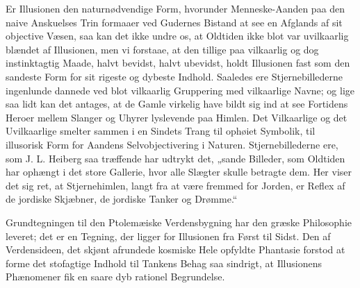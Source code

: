 \documentclass[12pt,a4paper]{book}
\begin{document}
Er Illusionen den naturnødvendige Form, hvorunder Menneske-Aanden paa
den naive Anskuelses Trin formaaer ved Gudernes Bistand at see en
Afglands af sit objective Væsen, saa kan det ikke undre os, at Oldtiden
ikke blot var uvilkaarlig blændet af Illusionen, men vi forstaae, at
den tillige paa vilkaarlig og dog instinktagtig Maade, halvt bevidst,
halvt ubevidst, holdt Illusionen fast som den sandeste Form for sit
rigeste og dybeste Indhold. Saaledes ere Stjernebillederne ingenlunde
dannede ved blot vilkaarlig Gruppering med vilkaarlige Navne; og lige
saa lidt kan det antages, at de Gamle virkelig have bildt sig ind at
see Fortidens Heroer mellem Slanger og Uhyrer lyslevende paa Himlen.
Det Vilkaarlige og det Uvilkaarlige smelter sammen i en Sindets Trang
til ophøiet Symbolik, til illusorisk Form for Aandens
Selvobjectivering i Naturen. Stjernebillederne ere, som J. L. Heiberg
saa træffende har udtrykt det, „sande Billeder, som Oldtiden har
ophængt i det store Gallerie, hvor alle Slægter skulle betragte dem.
Her viser det sig ret, at Stjernehimlen, langt fra at være fremmed for
Jorden, er Reflex af de jordiske Skjæbner, de jordiske Tanker og
Drømme.“

Grundtegningen til den Ptolemæiske Verdensbygning har den græske
Philosophie leveret; det er en Tegning, der ligger for Illusionen fra
Først til Sidst. Den af Verdensideen, det skjønt afrundede kosmiske
Hele opfyldte Phantasie forstod at forme det stofagtige Indhold til
Tankens Behag saa sindrigt, at Illusionens Phænomener fik en saare dyb
rationel Begrundelse.
\end{document}
